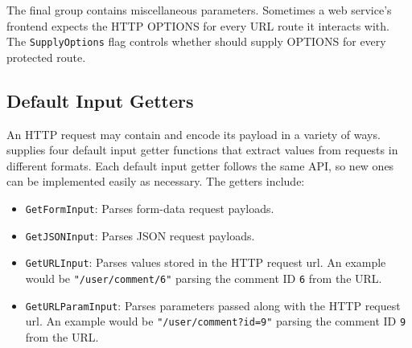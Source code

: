 
The final group contains miscellaneous parameters. Sometimes a web service's frontend expects the HTTP OPTIONS for every URL route it interacts with. The \lstinline{SupplyOptions} flag controls whether \sys{} should supply OPTIONS for every protected route.








\subsection{Default Input Getters}\label{Sec:DefaultInputGetters}

An HTTP request may contain and encode its payload in a variety of ways. \sys{} supplies four default input getter functions that extract values from requests in different formats. Each default input getter follows the same API, so new ones can be implemented easily as necessary. The getters include:

\begin{itemize}[nosep]
\item \lstinline{GetFormInput}: Parses form-data request payloads.

\item \lstinline{GetJSONInput}: Parses JSON request payloads.

\item \lstinline{GetURLInput}: Parses values stored in the HTTP request url. An example would be \lstinline{"/user/comment/6"} parsing the comment ID \lstinline{6} from the URL.

\item \lstinline{GetURLParamInput}: Parses parameters passed along with the HTTP request url. An example would be \lstinline{"/user/comment?id=9"} parsing the comment ID \lstinline{9} from the URL.

\end{itemize}

